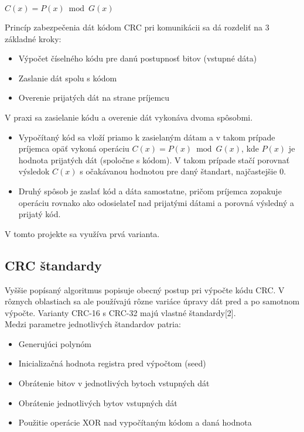\documentclass[11pt,a4paper]{article}
\begin{document}
\begin{center}
$C(x) = P(x) \bmod G(x)$
\end{center}

\noindent Princíp zabezpečenia dát kódom CRC pri komunikácii sa dá rozdeliť na 3 základné kroky:
\begin{itemize}
\item Výpočet číselného kódu pre danú postupnosť bitov (vstupné dáta)
\item Zaslanie dát spolu s kódom
\item Overenie prijatých dát na strane príjemcu
\end{itemize}

\noindent V praxi sa zasielanie kódu a overenie dát vykonáva dvoma spôsobmi. 
\begin{itemize}
\item Vypočítaný kód sa vloží priamo k zasielaným dátam a v takom prípade príjemca opäť vykoná operáciu $C(x)=P(x) \bmod G(x)$, kde $P(x)$ je hodnota prijatých dát (spoločne s kódom). V takom prípade stačí porovnať výsledok $C(x)$ s očakávanou hodnotou pre daný štandart, najčastejšie 0.

\item Druhý spôsob je zaslať kód a dáta samostatne, pričom príjemca zopakuje operáciu rovnako ako odosielateľ nad prijatými dátami a porovná výsledný a prijatý kód. 

\end{itemize}
\noindent V tomto projekte sa využíva prvá varianta.

\subsection{CRC štandardy}

Vyššie popísaný algoritmus popisuje obecný postup pri výpočte kódu CRC. V rôznych oblastiach sa ale používajú rôzne variáce úpravy dát pred a po samotnom výpočte. Varianty CRC-16 s CRC-32 majú vlastné štandardy[2].\\

\noindent Medzi parametre jednotlivých štandardov patria:
\begin{itemize}
\item Generujúci polynóm
\item Inicializačná hodnota registra pred výpočtom (seed)
\item Obrátenie bitov v jednotlivých bytoch vstupných dát
\item Obrátenie jednotlivých bytov vstupných dát
\item Použitie operácie XOR nad vypočítaným kódom a daná hodnota
\end{itemize}
\end{document}
